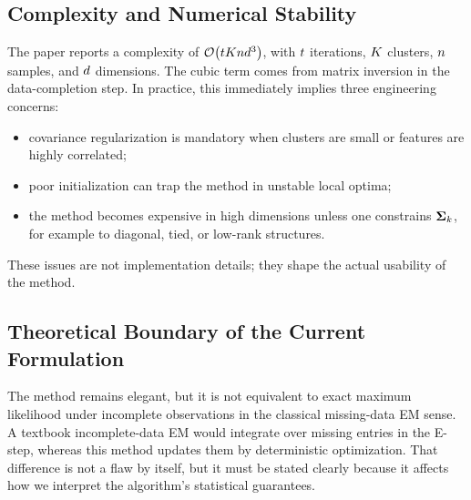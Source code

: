 \subsection{Complexity and Numerical Stability}
The paper reports a complexity of $\mathcal{O}\paren*{\scal{t}\scal{K}\scal{n}\scal{d}^3}$, with $t$ iterations, $K$ clusters, $n$ samples, and $d$ dimensions. The cubic term comes from matrix inversion in the data-completion step. In practice, this immediately implies three engineering concerns:
\begin{itemize}
    \item covariance regularization is mandatory when clusters are small or features are highly correlated;
    \item poor initialization can trap the method in unstable local optima;
    \item the method becomes expensive in high dimensions unless one constrains $\mathbf{\Sigma}_k$, for example to diagonal, tied, or low-rank structures.
\end{itemize}

These issues are not implementation details; they shape the actual usability of the method.

\subsection{Theoretical Boundary of the Current Formulation}
The method remains elegant, but it is not equivalent to exact maximum likelihood under incomplete observations in the classical missing-data EM sense. A textbook incomplete-data EM would integrate over missing entries in the E-step, whereas this method updates them by deterministic optimization. That difference is not a flaw by itself, but it must be stated clearly because it affects how we interpret the algorithm's statistical guarantees.
